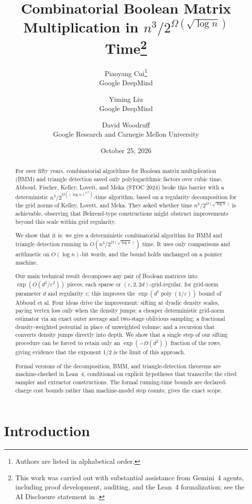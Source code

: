 \documentclass[11pt]{article}
\title{\textbf{Combinatorial Boolean Matrix Multiplication in $n^3 / 2^{\Omega(\sqrt{\log n})}$ Time}\thanks{This work was carried out with substantial assistance from Gemini~4 agents, including proof development, auditing, and the Lean~4 formalization; see the AI Disclosure statement in \Cref{sec:ai-disclosure}.}}
\author{
Piaoyang Cui\thanks{Authors are listed in alphabetical order.}\\
{\small Google DeepMind}
\and
Yiming Liu\footnotemark[2]\\
{\small Google DeepMind}
\and
David Woodruff\footnotemark[2]\\
{\small Google Research and Carnegie Mellon University}
}
\date{October 25, 2026}
\theoremstyle{definition}
\renewcommand{\label}[1]{}%
\newcommand{\poly}{\operatorname{poly}}
\begin{document}
\maketitle

\begin{abstract}
For over fifty years, combinatorial algorithms for Boolean matrix multiplication (BMM) and triangle detection saved only polylogarithmic factors over cubic time. Abboud, Fischer, Kelley, Lovett, and Meka (STOC 2024) broke this barrier with a deterministic $n^3 / 2^{\Omega((\log n)^{1/7})}$-time algorithm, based on a regularity decomposition for the grid norms of Kelley, Lovett, and Meka. They asked whether time $n^3 / 2^{\Omega(\sqrt{\log n})}$ is achievable, observing that Behrend-type constructions might obstruct improvements beyond this scale within grid regularity.

We show that it is: we give a deterministic combinatorial algorithm for BMM and triangle detection running in $O(n^3 / 2^{\Omega(\sqrt{\log n})})$ time. It uses only comparisons and arithmetic on $O(\log n)$-bit words, and the bound holds unchanged on a pointer machine.

Our main technical result decomposes any pair of Boolean matrices into $\exp(O(d^2 / \varepsilon^2))$ pieces, each sparse or $(\varepsilon, 2, 2d)$-grid-regular, for grid-norm parameter $d$ and regularity $\varepsilon$; this improves the $\exp(d^7 \poly(1/\varepsilon))$ bound of Abboud et al. Four ideas drive the improvement: sifting at dyadic density scales, paying vertex loss only when the density jumps; a cheaper deterministic grid-norm estimator via an exact outer average and two-stage oblivious sampling; a fractional density-weighted potential in place of unweighted volume; and a recursion that converts density jumps directly into depth. We show that a single step of our sifting procedure can be forced to retain only an $\exp(-\Omega(d^2))$ fraction of the rows, giving evidence that the exponent $1/2$ is the limit of this approach.

Formal versions of the decomposition, BMM, and triangle-detection theorems are machine-checked in Lean~4, conditional on explicit hypotheses that transcribe the cited sampler and extractor constructions. The formal running-time bounds are declared-charge cost bounds rather than machine-model step counts;  gives the exact scope.
\end{abstract}

\section{Introduction}
\label{sec:intro}
\end{document}
